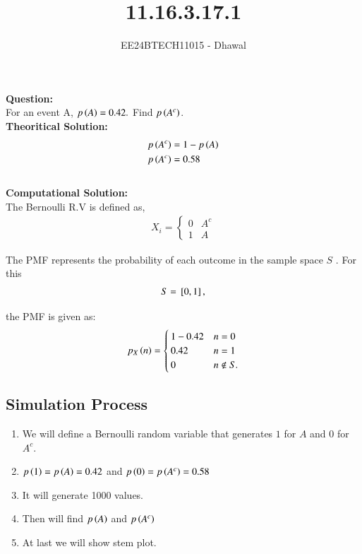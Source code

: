 \documentclass[journal]{IEEEtran}
\begin{document}

\vspace{3cm}

\title{11.16.3.17.1}
\author{EE24BTECH11015 - Dhawal}

{\let\newpage\relax\maketitle}

\renewcommand{\thefigure}{\theenumi}
\renewcommand{\thetable}{\theenumi}
\setlength{\intextsep}{10pt} %

\textbf{Question:}\\
For an event A, $p\left(A\right)=0.42.$ Find $p\left(A^c\right)$.\\
	
	\textbf{Theoritical Solution:}
	\begin{align}
		p\left(A^c\right)&=1-p\left(A\right)\\
        p\left(A^c\right)&=0.58
	\end{align}\\
	\textbf{Computational Solution:}\\
	The Bernoulli R.V is defined as,
\begin{align}
	X_i = \begin{cases}
		0 & A^c\\	
		1 & A	
	\end{cases}
\end{align}

    The PMF represents the probability of each outcome in the sample space $S$ . For this
\begin{align*}
    S = {}\left[0, 1\right],
\end{align*}

the PMF is given as:
\begin{align}
p_X\left(n\right) = \begin{cases}
    1-0.42 & n = 0\\
    0.42 & n = 1 \\ 
    0 & n \notin S.
\end{cases}
\end{align}

\subsection*{Simulation Process}
\begin{enumerate}
    \item We will define a Bernoulli random variable that generates $1$ for $A$ and $0$ for $A^c$.
    \item $p\left(1\right)=p\left(A\right)=0.42$ and $p\left(0\right)=p\left(A^c\right)=0.58$ 
    \item It will generate 1000 values.
    \item Then will find $p\left(A\right)$ and $p\left(A^c\right)$
    \item At last we will show stem plot.
\end{enumerate}
\end{document}
